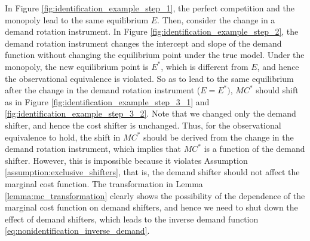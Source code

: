 \documentclass[11pt, a4paper]{article}
\begin{document}
In Figure \ref{fig:identification_example_step_1}, the perfect competition and the monopoly lead to the same equilibrium $E$.
Then, consider the change in a demand rotation instrument.
In Figure \ref{fig:identification_example_step_2}, the demand rotation instrument changes the intercept and slope of the demand function without changing the equilibrium point under the true model.
Under the monopoly, the new equilibrium point is $E^{*}$, which is different from $E$, and hence the observational equivalence is violated.
So as to lead to the same equilibrium after the change in the demand rotation instrument ($E = E^{*})$, $MC^{*}$ should shift as in Figure \ref{fig:identification_example_step_3_1} and \ref{fig:identification_example_step_3_2}.
Note that we changed only the demand shifter, and hence the cost shifter is unchanged.
Thus, for the observational equivalence to hold, the shift in $MC^{*}$ should be derived from the change in the demand rotation instrument, which implies that $MC^{*}$ is a function of the demand shifter.
However, this is impossible because it violates Assumption \ref{assumption:exclusive_shifters}, that is, the demand shifter should not affect the marginal cost function.
The transformation in Lemma \ref{lemma:mc_transformation} clearly shows the possibility of the dependence of the marginal cost function on demand shifters, and hence we need to shut down the effect of demand shifters, which leads to the inverse demand function \eqref{eq:nonidentification_inverse_demand}.
\end{document}
